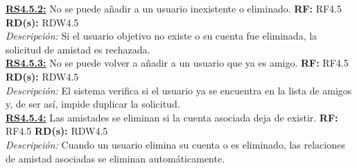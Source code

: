 \textbf{\textcolor{verde}{\underline{RS4.5.2:}}} No se puede añadir a un usuario inexistente o eliminado. \textbf{RF:} RF4.5 \textbf{RD(s):} RDW4.5 \\ 
\hspace*{1cm} \textit{Descripción:} Si el usuario objetivo no existe o su cuenta fue eliminada, la solicitud de amistad es rechazada. \\[4pt]

\textbf{\textcolor{verde}{\underline{RS4.5.3:}}} No se puede volver a añadir a un usuario que ya es amigo. \textbf{RF:} RF4.5 \textbf{RD(s):} RDW4.5 \\ 
\hspace*{1cm} \textit{Descripción:} El sistema verifica si el usuario ya se encuentra en la lista de amigos y, de ser así, impide duplicar la solicitud. \\[4pt]

\textbf{\textcolor{verde}{\underline{RS4.5.4:}}} Las amistades se eliminan si la cuenta asociada deja de existir. \textbf{RF:} RF4.5 \textbf{RD(s):} RDW4.5 \\ 
\hspace*{1cm} \textit{Descripción:} Cuando un usuario elimina su cuenta o es eliminado, las relaciones de amistad asociadas se eliminan automáticamente.
\newpage
